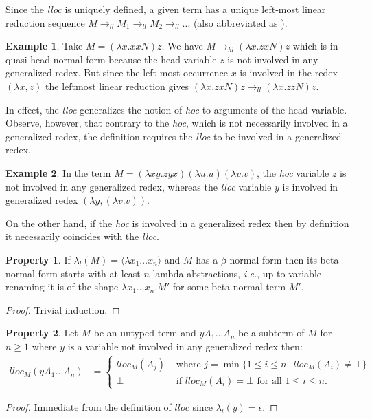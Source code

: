 \documentclass{elsarticle}
\makeatletter
\theoremstyle{plain}
\theoremstyle{definition}
\newtheorem{property}{Property}[section]
\newtheorem{example}{Example}[section]
\theoremstyle{remark}
\renewcommand\ie{{\it i.e.\@\xspace}}
\newcommand{\hlred}{\rightarrow_{hl}}
\newcommand{\llred}{\rightarrow_{ll}}
\makeatother
\begin{document}
Since the \emph{lloc} is uniquely defined, a given term has a unique left-most linear reduction sequence $M \llred M_1 \llred M_2 \llred \ldots$ (also abbreviated as ).

\begin{example}
Take $M = (\lambda x. x x N) z$. We have $M \hlred (\lambda x. z x N) z$ which is in quasi head normal form because the head variable $z$ is not involved in any generalized redex.
But since the left-most occurrence $x$ is involved in the redex $(\lambda x, z)$ the leftmost linear reduction gives $(\lambda x. z x N) z \llred (\lambda x. z z N) z$.
\end{example}

In effect, the \emph{lloc} generalizes the notion of \emph{hoc} to arguments of the head variable. Observe, however, that contrary to the \emph{hoc}, which is not necessarily involved in a generalized redex, the definition requires the \emph{lloc} to be involved in a generalized redex.
\begin{example}In the term $M = (\lambda x y . z y x) (\lambda u . u) (\lambda v . v)$, the \emph{hoc} variable $z$ is not involved in any generalized redex, whereas the \emph{lloc} variable $y$ is involved in generalized redex $(\lambda y, (\lambda v.v))$.
\end{example}
On the other hand, if the \emph{hoc} is involved in a generalized redex then by definition it necessarily coincides with the \emph{lloc}.

\begin{property}
    If $\lambda_l(M) = \langle \lambda x_1 \ldots x_n \rangle$ and $M$ has a $\beta$-normal form then its beta-normal form starts with at least $n$ lambda abstractions, \ie, up to variable renaming it is of the shape $\lambda x_1 \ldots x_n . M'$ for some beta-normal term $M'$.
\end{property}
\begin{proof}
    Trivial induction.
\end{proof}


\begin{property}
\label{prop:qnf_longapply}
    Let $M$ be an untyped term and $y A_1 \ldots A_n$ be a subterm of $M$ for $n\geq1$ where $y$ is a variable not involved in any generalized redex then:
    \begin{align*}
    lloc_M(y A_1 \ldots A_n) &=
        \begin{cases}
         lloc_M (A_j) &\mbox{ where } j = \min \{ 1\leq i\leq n \ | \ lloc_M (A_i) \neq \bot\} \\
         \bot &\mbox{ if } lloc_M(A_i) = \bot \mbox{ for all } 1\leq i\leq n.
        \end{cases}
    \end{align*}
\end{property}
\begin{proof}
    Immediate from the definition of $lloc$ since $\lambda_l(y) = \epsilon$.
\end{proof}
\end{document}
